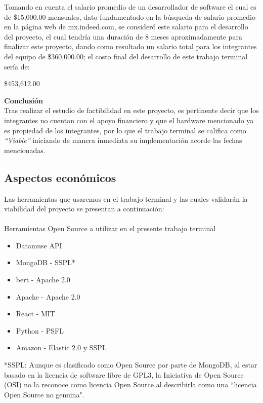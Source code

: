 \documentclass[12pt, a4paper, titlepage]{report}
\begin{document}
    	Tomando en cuenta el salario promedio de un desarrollador de software el cual es de \$15,000.00 mensuales, dato fundamentado en la búsqueda de salario promedio en la página web de mx.indeed.com, se consideró este salario para el desarrollo del proyecto, el cual tendría una duración de 8 meses aproximadamente para finalizar este proyecto, dando como resultado un salario total para los integrantes del equipo de \$360,000.00; el costo final del desarrollo de este trabajo terminal sería de: \\
    	\begin{center}
    		\$453,612.00
    	\end{center}
    	\textbf{Conclusión\\} 
    	Tras realizar el estudio de factibilidad en este proyecto, es pertinente decir que los integrantes no cuentan con el apoyo financiero y que el hardware mencionado ya es propiedad de los integrantes, por lo que el trabajo terminal se califica como \textit{“Viable”} iniciando de manera inmediata su implementación acorde las fechas mencionadas.
    	
    	\subsection{Aspectos económicos}
    	Las herramientas que usaremos en el trabajo terminal y las cuales validarán la viabilidad del proyecto se presentan a continuación:\\\\
    	Herramientas Open Source a utilizar en el presente trabajo terminal
    	
    	\begin{itemize}
    		\item Datamuse API \cite{refDatamuseLicense}
    		\item MongoDB - SSPL* \cite{refMongoDBLicense}
    		\item \acrshort{bert} - Apache 2.0 \cite{refBERTLicense}
    		\item Apache - Apache 2.0 \cite{refApacheLicense}
    		\item React - MIT \cite{refReactLicense}
    		\item Python - PSFL \cite{refPythonLicense}
    		\item Amazon - Elastic 2.0 y SSPL \cite{refAmazonLicense}
    	\end{itemize}
    	
    	*SSPL: Aunque es clasificado como Open Source por parte de MongoDB, al estar basado en la licencia de software libre de GPL3, la Iniciativa de Open Source (OSI) no la reconoce como licencia Open Source al describirla como una “licencia Open Source no genuina".\\
    	
\end{document}

